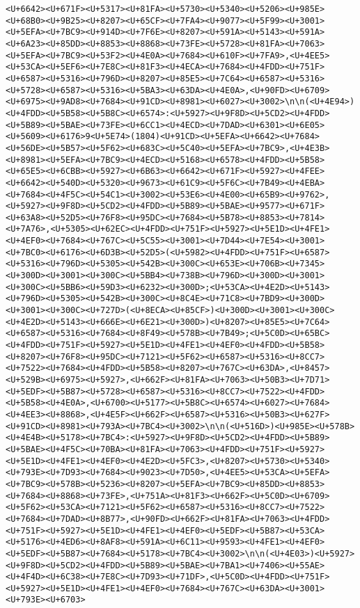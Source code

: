 \documentclass[
]{article}
\begin{document}
\begin{verbatim}
<U+6642><U+671F><U+5317><U+81FA><U+5730><U+5340><U+5206><U+985E><U+68B0><U+9B25><U+8207><U+65CF><U+7FA4><U+9077><U+5F99><U+3001><U+5EFA><U+7BC9><U+914D><U+7F6E><U+8207><U+591A><U+5143><U+591A><U+6A23><U+85DD><U+8853><U+8868><U+73FE><U+5728><U+81FA><U+7063><U+5EFA><U+7BC9><U+53F2><U+4E0A><U+7684><U+610F><U+7FA9>,<U+4EE5><U+53CA><U+5EF6><U+7E8C><U+81F3><U+4ECA><U+7684><U+4FDD><U+751F><U+6587><U+5316><U+796D><U+8207><U+85E5><U+7C64><U+6587><U+5316><U+5728><U+6587><U+5316><U+5BA3><U+63DA><U+4E0A>,<U+90FD><U+6709><U+6975><U+9AD8><U+7684><U+91CD><U+8981><U+6027><U+3002>\n\n(<U+4E94>)<U+4FDD><U+5B58><U+5B8C><U+6574>:<U+5927><U+9F8D><U+5CD2><U+4FDD><U+5B89><U+5BAE><U+73FE><U+6CC1><U+4ECD><U+7DAD><U+6301><U+6E05><U+5609><U+6176>9<U+5E74>(1804)<U+91CD><U+5EFA><U+6642><U+7684><U+56DE><U+5B57><U+5F62><U+683C><U+5C40><U+5EFA><U+7BC9>,<U+4E3B><U+8981><U+5EFA><U+7BC9><U+4ECD><U+5168><U+6578><U+4FDD><U+5B58><U+65E5><U+6CBB><U+5927><U+6B63><U+6642><U+671F><U+5927><U+4FEE><U+6642><U+540D><U+5320><U+9673><U+61C9><U+5F6C><U+7B49><U+4EBA><U+7684><U+4F5C><U+54C1><U+3002><U+53E6><U+4E00><U+65B9><U+9762>,<U+5927><U+9F8D><U+5CD2><U+4FDD><U+5B89><U+5BAE><U+9577><U+671F><U+63A8><U+52D5><U+76F8><U+95DC><U+7684><U+5B78><U+8853><U+7814><U+7A76>,<U+5305><U+62EC><U+4FDD><U+751F><U+5927><U+5E1D><U+4FE1><U+4EF0><U+7684><U+767C><U+5C55><U+3001><U+7D44><U+7E54><U+3001><U+7BC0><U+6176><U+6D3B><U+52D5>(<U+5982><U+4FDD><U+751F><U+6587><U+5316><U+796D><U+5305><U+542B><U+300C><U+653E><U+706B><U+7345><U+300D><U+3001><U+300C><U+5BB4><U+738B><U+796D><U+300D><U+3001><U+300C><U+5BB6><U+59D3><U+6232><U+300D>;<U+53CA><U+4E2D><U+5143><U+796D><U+5305><U+542B><U+300C><U+8C4E><U+71C8><U+7BD9><U+300D><U+3001><U+300C><U+727D>(<U+8ECA><U+85CF>)<U+300D><U+3001><U+300C><U+4E2D><U+5143><U+666E><U+6E21><U+300D>)<U+8207><U+85E5><U+7C64><U+6587><U+5316><U+7684><U+8F49><U+578B><U+7B49>;<U+5C0D><U+65BC><U+4FDD><U+751F><U+5927><U+5E1D><U+4FE1><U+4EF0><U+4FDD><U+5B58><U+8207><U+76F8><U+95DC><U+7121><U+5F62><U+6587><U+5316><U+8CC7><U+7522><U+7684><U+4FDD><U+5B58><U+8207><U+767C><U+63DA>,<U+8457><U+529B><U+6975><U+5927>,<U+662F><U+81FA><U+7063><U+50B3><U+7D71><U+5EDF><U+5B87><U+5728><U+6587><U+5316><U+8CC7><U+7522><U+4FDD><U+5B58><U+4E0A>,<U+6700><U+5177><U+5B8C><U+6574><U+6027><U+7684><U+4EE3><U+8868>,<U+4E5F><U+662F><U+6587><U+5316><U+50B3><U+627F><U+91CD><U+8981><U+793A><U+7BC4><U+3002>\n\n(<U+516D>)<U+985E><U+578B><U+4E4B><U+5178><U+7BC4>:<U+5927><U+9F8D><U+5CD2><U+4FDD><U+5B89><U+5BAE><U+4F5C><U+70BA><U+81FA><U+7063><U+4FDD><U+751F><U+5927><U+5E1D><U+4FE1><U+4EF0><U+4E2D><U+5FC3>,<U+8207><U+5730><U+5340><U+793E><U+7D93><U+7684><U+9023><U+7D50>,<U+4EE5><U+53CA><U+5EFA><U+7BC9><U+578B><U+5236><U+8207><U+5EFA><U+7BC9><U+85DD><U+8853><U+7684><U+8868><U+73FE>,<U+751A><U+81F3><U+662F><U+5C0D><U+6709><U+5F62><U+53CA><U+7121><U+5F62><U+6587><U+5316><U+8CC7><U+7522><U+7684><U+7DAD><U+8B77>,<U+90FD><U+662F><U+81FA><U+7063><U+4FDD><U+751F><U+5927><U+5E1D><U+4FE1><U+4EF0><U+5EDF><U+5B87><U+53CA><U+5176><U+4ED6><U+8AF8><U+591A><U+6C11><U+9593><U+4FE1><U+4EF0><U+5EDF><U+5B87><U+7684><U+5178><U+7BC4><U+3002>\n\n(<U+4E03>)<U+5927><U+9F8D><U+5CD2><U+4FDD><U+5B89><U+5BAE><U+7BA1><U+7406><U+55AE><U+4F4D><U+6C38><U+7E8C><U+7D93><U+71DF>,<U+5C0D><U+4FDD><U+751F><U+5927><U+5E1D><U+4FE1><U+4EF0><U+7684><U+767C><U+63DA><U+3001><U+793E><U+6703>
\end{verbatim}
\end{document}
